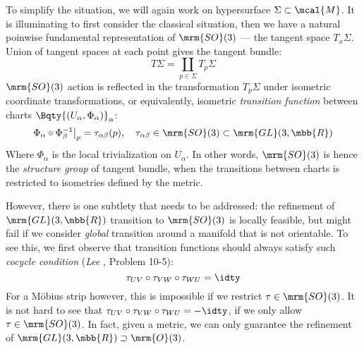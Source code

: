 \documentclass[a4paper,11pt]{article}
\begin{document}
	To simplify the situation, we will again work on hypersurface $\Sigma\subset\mcal{M}$. It is illuminating to first consider the classical situation, then we have a natural poinwise fundamental representation of $\mrm{SO}(3)$ --- the tangent space $T_x\Sigma$. Union of tangent spaces at each point gives the tangent bundle:
	\begin{equation}
		T\Sigma = \coprod_{p\in\Sigma} T_p\Sigma
	\end{equation}
	$\mrm{SO}(3)$ action is reflected in the transformation $T_p\Sigma$ under isometric coordinate transformations, or equivalently, isometric \textit{transition function} between charts $\Bqty{(U_\alpha,\Phi_\alpha)}_\alpha$:
	\begin{equation}
		\Phi_\alpha\circ\Phi_\beta^{\smash{-1}}
			\big|_p
		= \tau_{\alpha\beta} (p),\quad
		\tau_{\alpha\beta} \in \mrm{SO}(3)
			\subset \mrm{GL}(3,\mbb{R})
	\end{equation}
	Where $\Phi_\alpha$ is the local trivialization on $U_\alpha$. In other words, $\mrm{SO}(3)$ is hence the \textit{structure group} of tangent bundle, when the transitions between charts is restricted to isometries defined by the metric. 
	
	However, there is one subtlety that needs to be addressed: the refinement of $\mrm{GL}(3,\mbb{R})$ transition to $\mrm{SO}(3)$ is locally feasible, but might fail if we consider \textit{global} transition around a manifold that is not orientable. To see this, we first observe that transition functions should always satisfy such \textit{cocycle condition} (\textit{Lee} \cite{lee2012introduction}, Problem 10-5):
	\begin{equation}
		\tau_{UV}\circ\tau_{VW}\circ\tau_{WU} = \idty
	\end{equation}
	For a Möbius strip however, this is impossible if we restrict $\tau\in\mrm{SO}(3)$. It is not hard to see that $
		\tau_{UV}\circ\tau_{VW}\circ\tau_{WU} = -\idty
	$, if we only allow $\tau\in\mrm{SO}(3)$. In fact, given a metric, we can only guarantee the refinement of $\mrm{GL}(3,\mbb{R})\supset\mrm{O}(3)$. 
	
\end{document}
